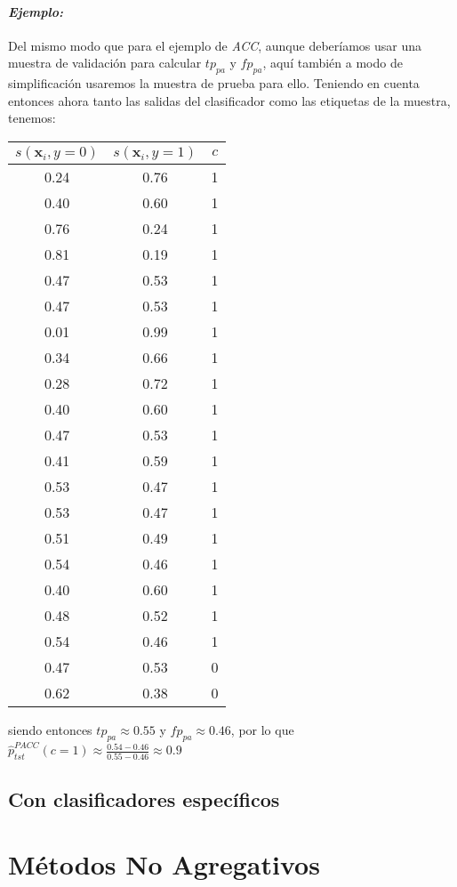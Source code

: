 \paragraph{\it Ejemplo:\/} Del mismo modo que para el ejemplo de {\it ACC},
aunque deberíamos usar una muestra de validación para calcular $tp_{pa}$ y
$fp_{pa}$, aquí también a modo de simplificación usaremos la muestra de prueba
para ello. Teniendo en cuenta entonces ahora tanto las salidas del clasificador
como las etiquetas de la muestra, tenemos:
\begin{center}
    \begin{tabular}{ccc}
        \toprule
        $s(\boldsymbol{x}_i, y=0)$ &  $s(\boldsymbol{x}_i, y=1)$ &  $c$ \\
        \midrule
           0.24 &    0.76 &  1 \\
           0.40 &    0.60 &  1 \\
           0.76 &    0.24 &  1 \\
           0.81 &    0.19 &  1 \\
           0.47 &    0.53 &  1 \\
           0.47 &    0.53 &  1 \\
           0.01 &    0.99 &  1 \\
           0.34 &    0.66 &  1 \\
           0.28 &    0.72 &  1 \\
           0.40 &    0.60 &  1 \\
           0.47 &    0.53 &  1 \\
           0.41 &    0.59 &  1 \\
           0.53 &    0.47 &  1 \\
           0.53 &    0.47 &  1 \\
           0.51 &    0.49 &  1 \\
           0.54 &    0.46 &  1 \\
           0.40 &    0.60 &  1 \\
           0.48 &    0.52 &  1 \\
           0.54 &    0.46 &  1 \\
           0.47 &    0.53 &  0 \\
           0.62 &    0.38 &  0 \\
        \bottomrule
        \end{tabular}
\end{center}
siendo entonces $tp_{pa} \approx 0.55$ y $fp_{pa} \approx 0.46$, por lo que
$\hat p^{PACC}_{tst}(c=1) \approx \frac{0.54-0.46}{0.55-0.46} \approx  0.9$

\subsection{Con clasificadores específicos}

\section{Métodos No Agregativos}\label{puntual:no_agregativos}

